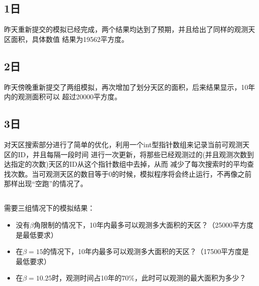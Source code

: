 \subsection{1日}
昨天重新提交的模拟已经完成，两个结果均达到了预期，并且给出了同样的观测天区面积，具体数值
结果为19562平方度。

\subsection{2日}
昨天傍晚重新提交了两组模拟，再次增加了划分天区的面积，后来结果显示，10年内的观测面积可以
超过20000平方度。

\subsection{3日}
对天区搜索部分进行了简单的优化，利用一个int型指针数组来记录当前可观测天区的ID，并且每隔一段时间
进行一次更新，将那些已经观测过的(并且观测次数到达指定的次数)天区的ID从这个指针数组中去掉，从而
减少了每次搜索时的平均查找次数。当可观测天区的数目等于0的时候，模拟程序将会终止运行，不再像之前
那样出现“空跑”的情况了。

\subsection{}

需要三组情况下的模拟结果：
\begin{itemize}
\item 没有$\beta$角限制的情况下，10年内最多可以观测多大面积的天区？（25000平方度是最低要求）
\item 在$\beta=15$\textdegree 的情况下，10年内最多可以观测多大面积的天区？（17500平方度是最低要求）
\item 在$\beta=10.25$\textdegree 时，观测时间占10年的$70\%$，此时可以观测的最大面积为多少？
\end{itemize}

